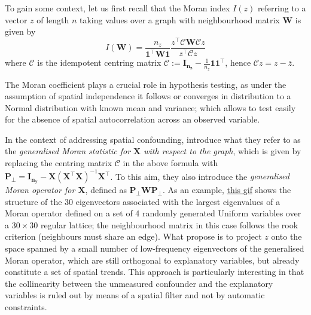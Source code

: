 \documentclass[openany, 11pt, oneside]{book}
\begin{document}
To gain some context, let us first recall that the Moran index $I(z)$ referring to a vector $z$ of length $n$ taking values over a graph with neighbourhood matrix $\boldsymbol{W}$ is given by 
%
\begin{equation}
I(\boldsymbol{W}) = \frac{n_z}{\boldsymbol{1^\top W 1}} \frac{z^\top \mathcal{C} \boldsymbol{W} \mathcal{C}z}{z^\top \mathcal{C}z}
\label{eq:I_moran}
\end{equation}
%
where $\mathcal{C}$ is the idempotent centring matrix $\mathcal{C}:=\boldsymbol{I_{n_z}} - \frac{1}{n_z}\boldsymbol{11}^\top$, hence  $\mathcal{C}z = z - \bar{z}$. 

The Moran coefficient plays a crucial role in hypothesis testing, as under the assumption of spatial independence it follows \parencite[for Normal $z$][]{Cliff_Ord} or converges in distribution to \parencite[for non-Normal $x$][]{Griffith2010} a Normal distribution with known mean and variance; which allows to test easily for the absence of spatial autocorrelation across an observed variable. 

In the context of addressing spatial confounding, \cite{HughesHaran} introduce what they refer to as the \emph{generalised Moran statistic for $\boldsymbol{X}$ with respect to the graph}, which is given by replacing the centring matrix $\mathcal{C}$ in the above formula with $\boldsymbol{P_\bot} = \boldsymbol{I_{n_y}}-\boldsymbol{X}(\boldsymbol{X}^\top \boldsymbol{X})^{-1}\boldsymbol{X}^\top$. To this aim, they also introduce the \textit{generalised Moran operator for $\boldsymbol{X}$}, defined as $\boldsymbol{P_\bot  W P_\bot}$.
%
%
As an example, \href{https://github.com/lcef97/PhD_Thesis/blob/main/docs/Media/Moran_Eigenvectors.gif}{this gif} shows the structure of the 30 eigenvectors associated with the largest eigenvalues of a Moran operator defined on a set of 4 randomly generated Uniform variables over a $30 \times 30$ regular lattice; the neighbourhood matrix in this case follows the rook criterion (neighbours must share an edge).
%
What \cite{HughesHaran} propose is to project $z$ onto the space spanned by a small number of low-frequency eigenvectors of the generalised Moran operator, which are still orthogonal to explanatory variables, but already constitute a set of spatial trends. This approach is particularly interesting in that the collinearity between the unmeasured confounder and the explanatory variables is ruled out by means of a spatial filter and not by automatic constraints. 
\end{document}
